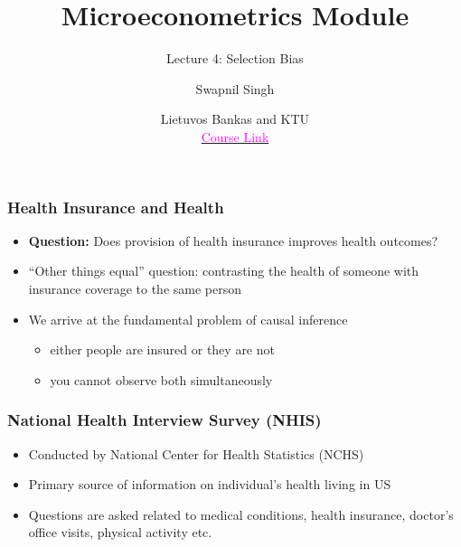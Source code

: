 \documentclass{beamer}
\title{Microeconometrics Module}
\subtitle{Lecture 4: Selection Bias}
\author{Swapnil Singh}
\date{Lietuvos Bankas and KTU \\ \href{https://github.com/swapnil1987/econometrics-2024}{\textcolor{magenta}{Course Link}}}
\begin{document}
	
	\maketitle
	
	
	
	\begin{frame}
		\frametitle{Health Insurance and Health}
		\begin{itemize}
			\item \textbf{Question:} Does provision of health insurance improves health outcomes?
			\item ``Other things equal'' question: contrasting the health of someone with insurance coverage to the same person 
			\item We arrive at the fundamental problem of causal inference
			\begin{itemize}
				\item either people are insured or they are not
				\item you cannot observe both simultaneously
			\end{itemize}
		\end{itemize}
	\end{frame}
	
	
	\begin{frame}
		\frametitle{National Health Interview Survey (NHIS)}
		\begin{itemize}
			\item Conducted by National Center for Health Statistics (NCHS)
			\item Primary source of information on individual's health living in US
			\item Questions are asked related to medical conditions, health insurance, doctor's office visits, physical activity etc.
		\end{itemize}
	\end{frame}
	
\end{document}

